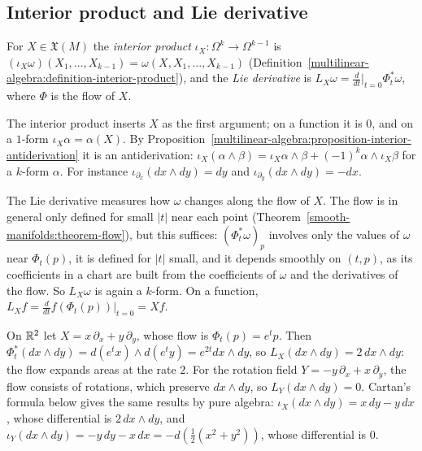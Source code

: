 \subsection{Interior product and Lie derivative}\label{differential-forms:subsection-lie}

\begin{definition}\label{differential-forms:definition-interior-lie}
For $X \in \mathfrak{X}(M)$ the \emph{interior product} $\iota_X \colon \Omega^k \to \Omega^{k-1}$ is $(\iota_X\omega)(X_1, \ldots, X_{k-1}) = \omega(X, X_1, \ldots, X_{k-1})$
(Definition~\ref{multilinear-algebra:definition-interior-product}), and the \emph{Lie derivative} is $L_X\omega = \frac{d}{dt}\big|_{t=0}\Phi_t^*\omega$, where $\Phi$ is the flow of $X$.
\end{definition}

The interior product inserts $X$ as the first argument; on a function it is $0$, and on a $1$-form $\iota_X\alpha = \alpha(X)$. By
Proposition~\ref{multilinear-algebra:proposition-interior-antiderivation} it is an antiderivation: $\iota_X(\alpha \wedge \beta) = \iota_X\alpha \wedge \beta + (-1)^k\alpha \wedge \iota_X\beta$ for a
$k$-form $\alpha$. For instance $\iota_{\partial_x}(dx \wedge dy) = dy$ and $\iota_{\partial_y}(dx \wedge dy) = -dx$.

The Lie derivative measures how $\omega$ changes along the flow of $X$. The flow is in general only defined for small $|t|$ near each point
(Theorem~\ref{smooth-manifolds:theorem-flow}), but this suffices: $(\Phi_t^*\omega)_p$ involves only the values of $\omega$ near $\Phi_t(p)$, it is defined for $|t|$ small, and it depends
smoothly on $(t, p)$, as its coefficients in a chart are built from the coefficients of $\omega$ and the derivatives of the flow. So $L_X\omega$ is again a $k$-form. On a function,
$L_Xf = \frac{d}{dt}f(\Phi_t(p))|_{t=0} = Xf$.

\begin{example}\label{differential-forms:example-lie-derivative}
On $\mathbb{R}^2$ let $X = x\,\partial_x + y\,\partial_y$, whose flow is $\Phi_t(p) = e^tp$. Then $\Phi_t^*(dx \wedge dy) = d(e^tx) \wedge d(e^ty) = e^{2t}dx \wedge dy$, so
$L_X(dx \wedge dy) = 2\,dx \wedge dy$: the flow expands areas at the rate $2$. For the rotation field $Y = -y\,\partial_x + x\,\partial_y$, the flow consists of rotations, which preserve
$dx \wedge dy$, so $L_Y(dx \wedge dy) = 0$. Cartan's formula below gives the same results by pure algebra: $\iota_X(dx \wedge dy) = x\,dy - y\,dx$, whose differential is $2\,dx \wedge dy$, and
$\iota_Y(dx \wedge dy) = -y\,dy - x\,dx = -d(\frac12(x^2 + y^2))$, whose differential is $0$.
\end{example}


